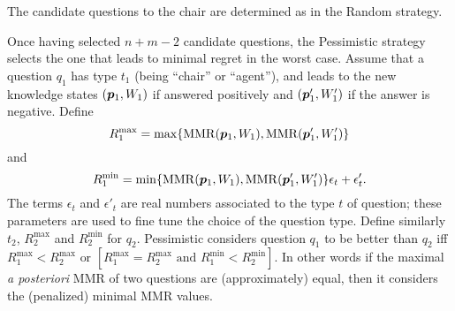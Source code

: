 \documentclass[runningheads]{llncs}
\theoremstyle{remark}
\begin{document}
The candidate questions to the chair are determined as in the Random strategy.

Once having selected $n + m - 2$ candidate questions, the Pessimistic strategy selects the one that leads to minimal regret in the worst case.
Assume that a question $q_1$ has type $t_1$ (being “chair” or “agent”), and leads to the new knowledge states $({\bm{p}}_1, W_1)$ if answered positively and $({\bm{p}}'_1, W'_1)$ if the answer is negative. 
Define \[R^{\max}_1 = \max\{\operatorname{MMR}({\bm{p}}_1, W_1), \operatorname{MMR}({\bm{p}}'_1, W'_1)\}\]
and \[R^{\min}_1 = \min\{\operatorname{MMR}({\bm{p}}_1, W_1), \operatorname{MMR}({\bm{p}}'_1, W'_1)\} \epsilon_{t} + \epsilon'_{t}.\]
The terms $\epsilon_t$ and $\epsilon'_{t}$ are real numbers associated to the type $t$ of question; these parameters are used to fine tune the choice of the question type. 
Define similarly $t_2$, $R^{\max}_2$ and $R^{\min}_2$ for  $q_2$.
Pessimistic considers question $q_1$ to be better  than $q_2$ iff $R^{\max}_1 < R^{\max}_2 \text{ or } [R^{\max}_1 = R^{\max}_2 \text{ and } R^{\min}_1 < R^{\min}_2]$.
In other words if the maximal {\em a posteriori} MMR of two questions are (approximately) equal, then it considers the (penalized) minimal MMR values. %
\end{document}
